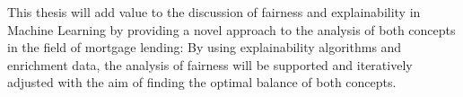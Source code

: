 
This thesis will add value to the discussion of fairness and explainability in Machine Learning by providing a novel approach to the analysis of both concepts in the field of mortgage lending: 
By using explainability algorithms and enrichment data, the analysis of fairness will be supported and iteratively adjusted with the aim of finding the optimal balance of both concepts.